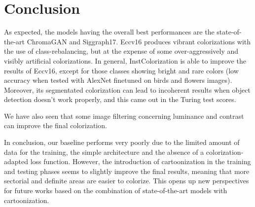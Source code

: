 \section{Conclusion}
As expected, the models having the overall best performances are the state-of-the-art ChromaGAN and Siggraph17. Eccv16 produces vibrant colorizations with the use of class-rebalancing, but at
the expense of some over-aggressively and visibly artificial colorizations. In general, InstColorization is able to improve the results of Eccv16, except for those classes showing bright and rare colors (low accuracy when tested with AlexNet finetuned on birds and flowers images). Moreover, its segmentated colorization can lead to incoherent results when object detection doesn't work properly, and this came out in the Turing test scores. 

We have also seen that some image filtering concerning luminance and contrast can improve the final colorization.

In conclusion, our baseline performs very poorly due to the limited amount of data for the training, the simple
architecture and the absence of a colorization-adapted loss function. However, the introduction of cartoonization
in the training and testing phases seems to slightly improve the final results, meaning that more sectorial and
definite areas are easier to colorize. This opens up new perspectives for future works based on the combination
of state-of-the-art models with cartoonization.
